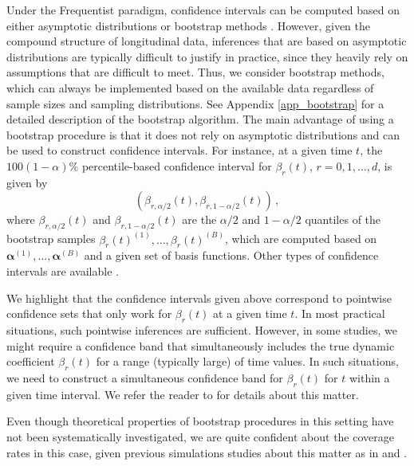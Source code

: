 \documentclass[letterpaper,10pt,openany]{article}
\def\al{\alpha}\def\alv{\boldsymbol{\alpha}}
\def\be{\beta}\def\bev{\boldsymbol{\beta}}
\begin{document}
Under the Frequentist paradigm, confidence intervals can be computed based on either asymptotic distributions or bootstrap methods \citep{efron-2016-computer}. However, given the compound structure of longitudinal data, inferences that are based on asymptotic distributions are typically difficult to justify in practice, since they heavily rely on assumptions that are difficult to meet. Thus, we consider bootstrap methods, which can always be implemented based on the available data regardless of sample sizes and sampling distributions. See Appendix \ref{app_bootstrap} for a detailed description of the bootstrap algorithm. The main advantage of using a bootstrap procedure is that it does not rely on asymptotic distributions and can be used to construct confidence intervals. For instance, at a given time $t$, the $100(1-\alpha)\%$ percentile-based confidence interval for $\be_r(t)$, $r=0,1,\ldots,d$, is given by 
\begin{equation}\label{eq_IC_betas}
\left( \be_{r,\alpha/2}(t), \be_{r,1-\alpha/2}(t) \right)\,,
\end{equation}
where $\be_{r,\alpha/2}(t)$ and $\be_{r,1-\alpha/2}(t)$ are the $\al/2$ and $1-\alpha/2$ quantiles of the bootstrap samples $\be_r(t)^{(1)},\ldots,\be_r(t)^{(B)}$, which are computed based on $\alv^{(1)},\ldots,\alv^{(B)}$ and a given set of basis functions.
Other types of confidence intervals are available \citep[e.g., normal-based confidence intervals; see][for a review]{efron-2016-computer}. {\color{black} We highlight that the confidence intervals given above correspond to pointwise confidence sets that only work for $\be_r(t)$ at a given time $t$. In most practical situations, such pointwise inferences are sufficient. However, in some studies, we might require a confidence band that simultaneously includes the true dynamic coefficient $\be_r(t)$ for a range (typically large) of time values. In such situations, we need to construct a simultaneous confidence band for $\be_r(t)$ for $t$ within a given time interval. We refer the reader to \cite{wu-tian-2018} for details about this matter. 
	
Even though theoretical properties of bootstrap procedures in this setting have not been systematically investigated, we are quite confident about the coverage rates in this case, given previous simulations studies about this matter as in \cite{hoover-rice-wu-yang-98} and \cite{wu-2000-kernel} \cite[see also][and refereces therein for a comprehensive review and also more empirical evidence in this regard]{wu-tian-2018}. 
}
\end{document}
